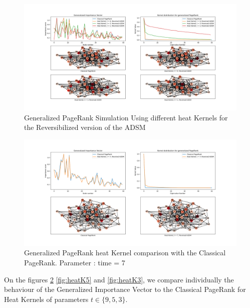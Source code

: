 \documentclass{article}
\begin{document}
\begin{figure}[h!]
    \centering
    \centerline{
    \includegraphics[width= 1.55\textwidth]{results_figures/heat_kernel_comparison_2.png}}
    \caption{Generalized PageRank Simulation Using different heat Kernels for the Reversibilized version of the ADSM}
    \label{fig:heatKComparison2}
\end{figure}

\begin{figure}[h!]
    \centering
    \centerline{
    \includegraphics[width= 1.55\textwidth]{results_figures/heat_kernel_7.png}
    }
    \caption{Generalized PageRank heat Kernel comparison with the Classical PageRank. Parameter : time = 7}
    \label{fig:heatK9}
\end{figure}

On the figures \ref{fig:heatK9} \ref{fig:heatK5} and \ref{fig:heatK3}, we compare individually the behaviour of the Generalized Importance Vector to the Classical PageRank for Heat Kernels of parameters $t \in \{9, 5, 3\}$. 
\end{document}
